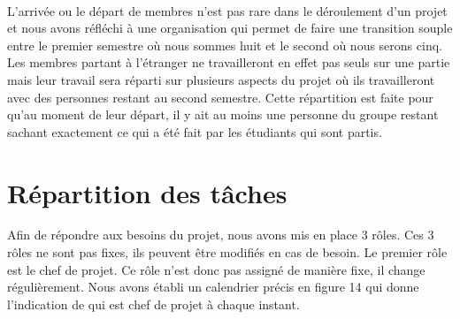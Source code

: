 \paragraph{}
L’arrivée ou le départ de membres n’est pas rare dans le déroulement d’un projet et nous avons
réfléchi à une organisation qui permet de faire une transition souple entre le premier semestre
où nous sommes huit et le second où nous serons cinq. Les membres partant à l’étranger ne
travailleront en effet pas seuls sur une partie mais leur travail sera réparti sur plusieurs
aspects du projet où ils travailleront avec des personnes restant au second semestre. Cette
répartition est faite pour qu’au moment de leur départ, il y ait au moins une personne du groupe
restant sachant exactement ce qui a été fait par les étudiants qui sont partis.

\section{Répartition des tâches}

Afin de répondre aux besoins du projet, nous avons mis en place 3 rôles. Ces 3 rôles ne sont pas fixes,
ils peuvent être modifiés en cas de besoin. Le premier rôle est le chef de projet. Ce rôle n’est donc pas
assigné de manière fixe, il change régulièrement. Nous avons établi un calendrier précis en figure 14
qui donne l’indication de qui est chef de projet à chaque instant.

